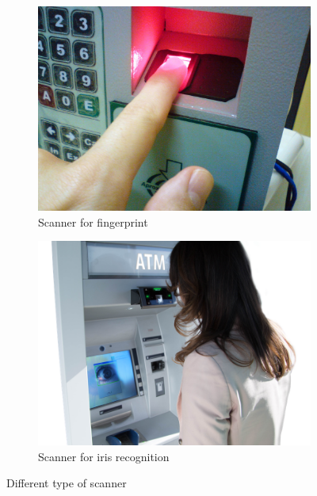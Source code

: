 \documentclass{article}
\begin{document}
\begin{figure}[htbp]
    \centering
    \begin{subfigure}[t]{0.45\textwidth}
        \centering
        \includegraphics[width=\linewidth]{Images/Theory/Fingerprint_scanner_identification.jpg}
        \caption{Scanner for fingerprint}
        \label{fig:scanner_fingerprint}
    \end{subfigure}
    \hfill
    \begin{subfigure}[t]{0.45\textwidth}
        \centering
        \includegraphics[width=\linewidth]{Images/Theory/eye.png}
        \caption{Scanner for iris recognition}
        \label{fig:scanner_eye}
    \end{subfigure}
    \caption{Different type of scanner}
    \label{fig:scanners}
\end{figure}
\end{document}
